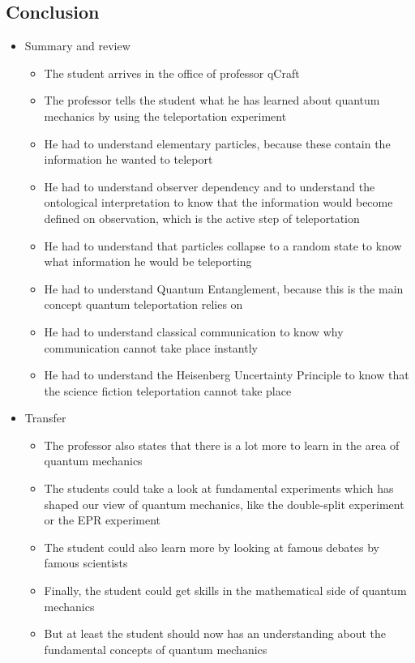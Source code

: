 \documentclass[11pt,twoside]{report} %
\begin{document}
\subsection{Conclusion}

\begin{itemize}
	\item Summary and review
	\begin{itemize}
		\item The student arrives in the office of professor qCraft
		\item The professor tells the student what he has learned about quantum mechanics by using the teleportation experiment
		\item He had to understand elementary particles, because these contain the information he wanted to teleport
		\item He had to understand observer dependency and to understand the ontological interpretation to know that the information would become defined on observation, which is the active step of teleportation
		\item He had to understand that particles collapse to a random state to know what information he would be teleporting
		\item He had to understand Quantum Entanglement, because this is the main concept quantum teleportation relies on
		\item He had to understand classical communication to know why communication cannot take place instantly
		\item He had to understand the Heisenberg Uncertainty Principle to know that the science fiction teleportation cannot take place
	\end{itemize}
	\item Transfer
	\begin{itemize}
		\item The professor also states that there is a lot more to learn in the area of quantum mechanics
		\item The students could take a look at fundamental experiments which has shaped our view of quantum mechanics, like the double-split experiment or the EPR experiment
		\item The student could also learn more by looking at famous debates by famous scientists
		\item Finally, the student could get skills in the mathematical side of quantum mechanics
		\item But at least the student should now has an understanding about the fundamental concepts of quantum mechanics

\end{itemize}
\end{itemize}
\end{document}
